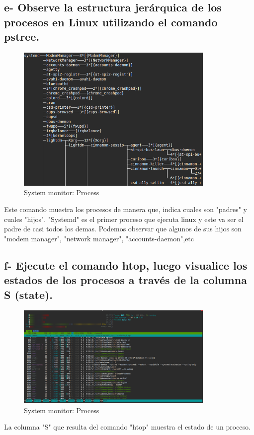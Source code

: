 \documentclass{article}
\begin{document}
\subsection*{e- Observe la estructura jerárquica de los procesos en Linux utilizando el comando pstree.}
\begin{figure}[h]
  \centering
  \includegraphics[width=0.85\textwidth]{resources/4e.png}
  \caption{System monitor: Process}
\end{figure}
Este comando muestra los procesos de manera que, indica cuales son "padres" y cuales "hijos".
"Systemd" es el primer proceso que ejecuta linux y este va ser el padre de casi todos los demas.
Podemos observar que algunos de sus hijos son "modem manager", "network manager", "accounts-daemon",etc
\subsection*{f- Ejecute el comando htop, luego visualice los estados de los procesos a través de la columna S (state).}
\begin{figure}[h]
  \centering
  \includegraphics[width=0.85\textwidth]{resources/4f.png}
  \caption{System monitor: Process}
\end{figure}
La columna "S" que resulta del comando "htop" muestra el estado de un proceso.  
\end{document}
